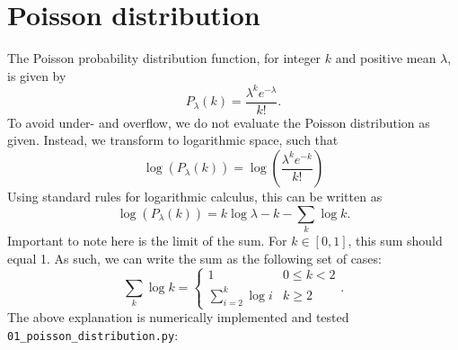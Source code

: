\section{Poisson distribution}
The Poisson probability distribution function, for integer $k$ and positive mean $\lambda$, is given by
\begin{equation}
	P_\lambda(k) = \frac{\lambda^k e^{-\lambda}}{k!}.
\end{equation}
To avoid under- and overflow, we do not evaluate the Poisson distribution as given. Instead, we transform to logarithmic space, such that
\begin{equation}
	\log\left(P_\lambda(k)\right) = \log\left(\frac{\lambda^k e^{-k}}{k!}\right)
\end{equation}
Using standard rules for logarithmic calculus, this can be written as
\begin{equation}
	\log\left(P_\lambda(k)\right) = k\log{\lambda} - k - \sum_k \log{k}.
\end{equation}
Important to note here is the limit of the sum. For $k\in[0,1]$, this sum should equal 1. As such, we can write the sum as the following set of cases:
\begin{equation}
	\sum_k \log{k} = \begin{cases}
				1 & 0 \leq k < 2\\
				\sum_{i=2}^k \log{i} & k \geq 2
			 \end{cases}.
\end{equation}
The above explanation is numerically implemented and tested \texttt{01\_poisson\_distribution.py}:


